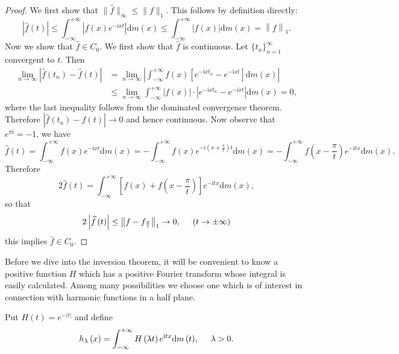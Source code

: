 \begin{proof}
We first show that $\|\widehat{f}\|_\infty\le\|f\|_1$. This follows by definition directly: 
$$
\left| \widehat{f}\left( t \right) \right|\le \int_{-\infty}^{+\infty}{\left| f\left( x \right) e^{-\mathrm{i}xt} \right|\mathrm{d}m\left( x \right)}\le \int_{-\infty}^{+\infty}{\left| f\left( x \right) \right|\mathrm{d}m\left( x \right)}=\left\| f \right\| _1.
$$
Now we show that $\widehat{f}\in C_0$. We first show that $\widehat{f}$ is continuous. Let $\{t_n\}_{n=1}^\infty$ convergent to $t$. Then 
$$
\begin{aligned}
\lim_{n\rightarrow \infty} \left| \widehat{f}\left( t_n \right) -\widehat{f}\left( t \right) \right|&=\lim_{n\rightarrow \infty} \left| \int_{-\infty}^{+\infty}{f\left( x \right) \left[ e^{-\mathrm{i}xt_n}-e^{-\mathrm{i}xt} \right] \mathrm{d}m\left( x \right)} \right|
\\
&\le \lim_{n\rightarrow \infty} \int_{-\infty}^{+\infty}{\left| f\left( x \right) \right|\cdot \left| e^{-\mathrm{i}xt_n}-e^{-\mathrm{i}xt} \right|\mathrm{d}m\left( x \right)}=0,
\end{aligned}
$$
where the last inequality follows from the dominated convergence theorem. Therefore $|\widehat{f}(t_n)-\widehat{f}(t)|\to 0$ and hence continuous. Now observe that $e^{\pi\mathrm{i}}=-1$, we have 
$$
\widehat{f}\left( t \right) =\int_{-\infty}^{+\infty}{f\left( x \right) e^{-\mathrm{i}xt}\mathrm{d}m\left( x \right)}=-\int_{-\infty}^{+\infty}{f\left( x \right) e^{-\mathrm{i}\left( x+\frac{\pi}{t} \right) t}\mathrm{d}m\left( x \right)}=-\int_{-\infty}^{+\infty}{f\left( x-\frac{\pi}{t} \right) e^{-\mathrm{i}tx}\mathrm{d}m\left( x \right)}.
$$
Therefore 
$$
2\widehat{f}\left( t \right) =\int_{-\infty}^{+\infty}{\left[ f\left( x \right) +f\left( x-\frac{\pi}{t} \right) \right] e^{-\mathrm{i}tx}\mathrm{d}m\left( x \right)},
$$
so that 
$$
2\left| \widehat{f}\left( t \right) \right|\le \left\| f-f_{\frac{\pi}{t}} \right\| _1\rightarrow 0,\hspace{0.5cm}\left( t\rightarrow \pm \infty \right) 
$$
this implies $\widehat{f}\in C_0$.
\end{proof}
Before we dive into the inversion theorem, it will be convenient to know a positive function $H$ which has a positive Fourier transform whose integral is easily calculated. Among many possibilities we choose one which is of interest in connection with harmonic functions in a half plane.\par
Put $H(t)=e^{-|t|}$ and define 
$$
h_{\lambda}\left( x \right) =\int_{-\infty}^{+\infty}{H\left( \lambda t \right) e^{\mathrm{i}tx}\mathrm{d}m\left( t \right)},\hspace{0.5cm}\lambda >0.
$$
